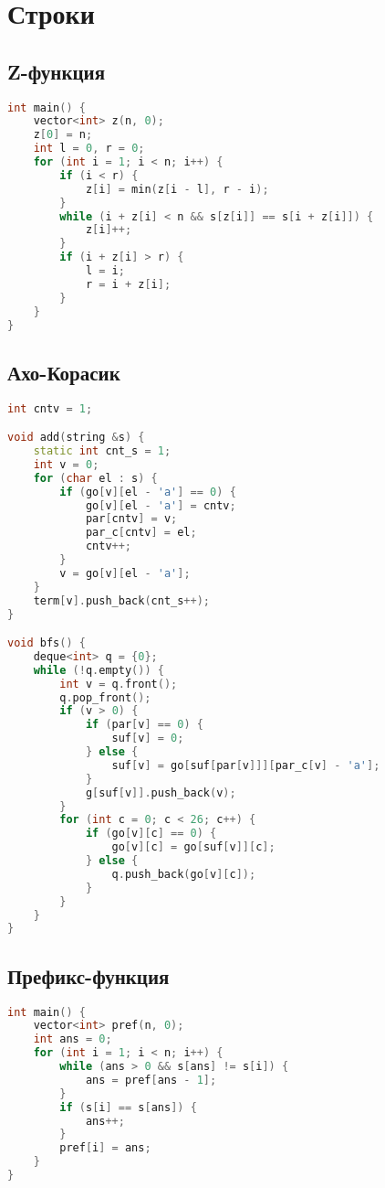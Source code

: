 \documentclass[10pt,a4paper,landscape,twosided]{extarticle}
\begin{document}
\begin{multicols*}{3}
\begin{lstlisting}[language=C++]
\end{lstlisting}

\section{Строки}

\subsection{Z-функция}
\begin{lstlisting}[language=C++]
int main() {
    vector<int> z(n, 0);
    z[0] = n;
    int l = 0, r = 0;
    for (int i = 1; i < n; i++) {
        if (i < r) {
            z[i] = min(z[i - l], r - i);
        }
        while (i + z[i] < n && s[z[i]] == s[i + z[i]]) {
            z[i]++;
        }
        if (i + z[i] > r) {
            l = i;
            r = i + z[i];
        }
    }
}

\end{lstlisting}

\subsection{Ахо-Корасик}
\begin{lstlisting}[language=C++]
int cntv = 1;

void add(string &s) {
    static int cnt_s = 1;
    int v = 0;
    for (char el : s) {
        if (go[v][el - 'a'] == 0) {
            go[v][el - 'a'] = cntv;
            par[cntv] = v;
            par_c[cntv] = el;
            cntv++;
        }
        v = go[v][el - 'a'];
    }
    term[v].push_back(cnt_s++);
}

void bfs() {
    deque<int> q = {0};
    while (!q.empty()) {
        int v = q.front();
        q.pop_front();
        if (v > 0) {
            if (par[v] == 0) {
                suf[v] = 0;
            } else {
                suf[v] = go[suf[par[v]]][par_c[v] - 'a'];
            }
            g[suf[v]].push_back(v);
        }
        for (int c = 0; c < 26; c++) {
            if (go[v][c] == 0) {
                go[v][c] = go[suf[v]][c];
            } else {
                q.push_back(go[v][c]);
            }
        }
    }
}

\end{lstlisting}

\subsection{Префикс-функция}
\begin{lstlisting}[language=C++]
int main() {
    vector<int> pref(n, 0);
    int ans = 0;
    for (int i = 1; i < n; i++) {
        while (ans > 0 && s[ans] != s[i]) {
            ans = pref[ans - 1];
        }
        if (s[i] == s[ans]) {
            ans++;
        }
        pref[i] = ans;
    }
}


\end{lstlisting}
\end{multicols*}
\end{document}
